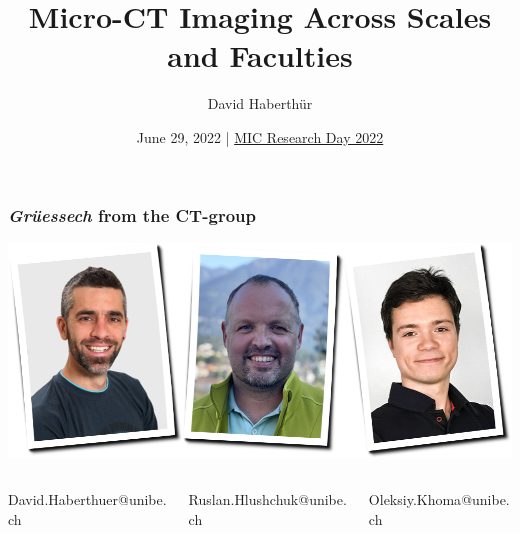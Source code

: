 \documentclass[aspectratio=169]{beamer}
\title{Micro-CT Imaging Across Scales and Faculties}
\author{David Haberthür}
\date{June 29, 2022 | \href{https://www.mic.unibe.ch/events/mic_research_day_2022}{MIC Research Day 2022}}
\newcommand{\uct}{\textmu CT\xspace}%
\begin{document}
{%
	\begin{frame}%
		\maketitle
	\end{frame}%
}

\begin{frame}
	\frametitle{\emph{Grüessech} from the \uct-group}
	\centering
	\includegraphics[width=0.925\linewidth]{./images/team}
		\begin{columns}
		\hfill\begin{column}{0.3\linewidth}
			\centering David{\color{ubRed!50}.}Haberthuer{\color{ubRed!50}@unibe.ch}
		\end{column}
		\begin{column}{0.3\linewidth}
			\centering Ruslan{\color{ubRed!50}.}Hlushchuk{\color{ubRed!50}@unibe.ch}
		\end{column}
		\begin{column}{0.3\linewidth}
			\centering Oleksiy{\color{ubRed!50}.}Khoma{\color{ubRed!50}@unibe.ch}
		\end{column}\hfill							
	\end{columns}
\end{frame}
	
\end{document}
